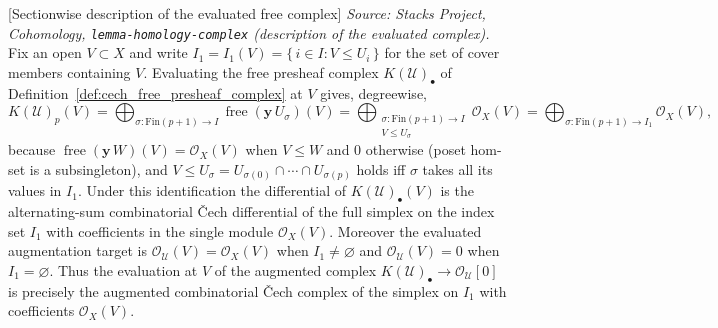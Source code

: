 \begin{lemma}

[Sectionwise description of the evaluated free complex]
  \label{lem:cech_free_eval_sectionwise}
  \textit{Source: Stacks Project, Cohomology, \texttt{lemma-homology-complex}
  (description of the evaluated complex).}
  Fix an open \(V \subset X\) and write \(I_1 = I_1(V) = \{\,i \in I : V \leq U_i\,\}\)
  for the set of cover members containing \(V\). Evaluating the free presheaf complex
  \(K(\mathcal{U})_\bullet\) of Definition~\ref{def:cech_free_presheaf_complex} at
  \(V\) gives, degreewise,
  \[
    K(\mathcal{U})_p(V)
      = \bigoplus_{\sigma : \mathrm{Fin}(p+1) \to I}
        \operatorname{free}(\mathbf{y}\,U_\sigma)(V)
      = \bigoplus_{\substack{\sigma : \mathrm{Fin}(p+1) \to I \\ V \leq U_\sigma}}
        \mathcal{O}_X(V)
      = \bigoplus_{\sigma : \mathrm{Fin}(p+1) \to I_1} \mathcal{O}_X(V),
  \]
  because \(\operatorname{free}(\mathbf{y}\,W)(V) = \mathcal{O}_X(V)\) when
  \(V \leq W\) and \(0\) otherwise (poset hom-set is a subsingleton), and
  \(V \leq U_\sigma = U_{\sigma(0)} \cap \cdots \cap U_{\sigma(p)}\) holds iff
  \(\sigma\) takes all its values in \(I_1\). Under this identification the
  differential of \(K(\mathcal{U})_\bullet(V)\) is the alternating-sum combinatorial
  {\v C}ech differential of the full simplex on the index set \(I_1\) with
  coefficients in the single module \(\mathcal{O}_X(V)\). Moreover the evaluated
  augmentation target is \(\mathcal{O}_{\mathcal{U}}(V) = \mathcal{O}_X(V)\) when
  \(I_1 \neq \varnothing\) and \(\mathcal{O}_{\mathcal{U}}(V) = 0\) when
  \(I_1 = \varnothing\). Thus the evaluation at \(V\) of the augmented complex
  \(K(\mathcal{U})_\bullet \to \mathcal{O}_{\mathcal{U}}[0]\)
  is precisely the augmented combinatorial
  {\v C}ech complex of the simplex on \(I_1\) with coefficients \(\mathcal{O}_X(V)\).
\end{lemma}


